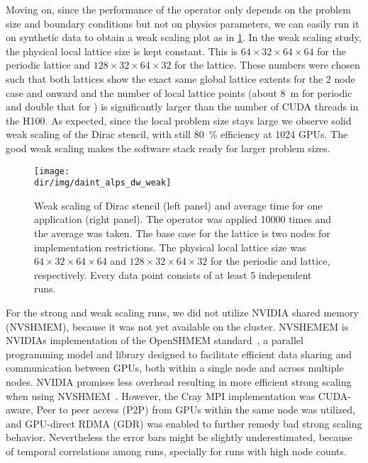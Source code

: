 Moving on, since the performance of the operator only depends on the problem size and boundary conditions but not on physics parameters, we can easily run it on synthetic data to obtain a weak scaling plot as in \cref{fig:daint:alps:dw:weak}.
In the weak scaling study, the physical local lattice size is kept constant.
This is $64 \times 32 \times 64 \times 64$ for the periodic lattice and $128 \times 32 \times 64 \times 32$ for the \Cstar lattice.
These numbers were chosen such that both lattices show the exact same global lattice extents for the \num{2} node case and onward and the number of local lattice points (about \SI{8}{m} for periodic and double that for \Cstar) is significantly larger than the number of CUDA threads in the H100.
As expected, since the local problem size stays large we observe solid weak scaling of the Dirac stencil, with still \SI{80}{\percent} efficiency at \num{1024} GPUs.
The good weak scaling makes the software stack ready for larger problem sizes.
\begin{figure}
    \centering
    \texttt{[image: \\dir/img/daint\_alps\_dw\_weak]}
    \caption{Weak scaling of Dirac stencil (left panel) and average time for one application (right panel). The operator was applied \num{10000} times and the average was taken. The base case for the \Cstar lattice is two nodes for implementation restrictions. The physical local lattice size was $64 \times 32 \times 64 \times 64$ and $128 \times 32 \times 64 \times 32$ for the periodic and \Cstar lattice, respectively. Every data point consists of at least \num{5} independent runs. }
    \label{fig:daint:alps:dw:weak}
\end{figure}

For the strong and weak scaling runs, we did not utilize NVIDIA shared memory (NVSHMEM), because it was not yet available on the cluster.
NVSHEMEM is NVIDIAs implementation of the OpenSHMEM standard~\cite{online:openshmem}, a parallel programming model and library designed to facilitate efficient data sharing and communication between GPUs, both within a single node and across multiple nodes.
NVIDIA promises less overhead resulting in more efficient strong scaling when using NVSHMEM~\cite{online:nvshmem}.
However, the Cray MPI implementation was CUDA-aware, Peer to peer access (P2P) from GPUs within the same node was utilized, and GPU-direct RDMA (GDR) was enabled to further remedy bad strong scaling behavior.
Nevertheless the error bars might be slightly underestimated, because of temporal correlations among runs, specially for runs with high node counts.

